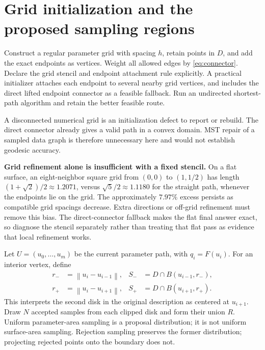 \documentclass[11pt,letterpaper]{article}
\newcommand{\norm}[1]{\left\lVert#1\right\rVert}
\begin{document}
\clearpage
\section{Grid initialization and the proposed sampling regions}
Construct a regular parameter grid with spacing $h$, retain points in $D$, and add the exact endpoints as vertices. Weight all allowed edges by \eqref{eq:connector}. Declare the grid stencil and endpoint attachment rule explicitly. A practical initializer attaches each endpoint to several nearby grid vertices, and includes the direct lifted endpoint connector as a feasible fallback. Run an undirected shortest-path algorithm and retain the better feasible route.

A disconnected numerical grid is an initialization defect to report or rebuild. The direct connector already gives a valid path in a convex domain. MST repair of a sampled data graph is therefore unnecessary here and would not establish geodesic accuracy.

\textbf{Grid refinement alone is insufficient with a fixed stencil.} On a flat surface, an eight-neighbor square grid from $(0,0)$ to $(1,1/2)$ has length $(1+\sqrt{2})/2\approx1.2071$, versus $\sqrt{5}/2\approx1.1180$ for the straight path, whenever the endpoints lie on the grid. The approximately $7.97\%$ excess persists as compatible grid spacings decrease. Extra directions or off-grid refinement must remove this bias. The direct-connector fallback makes the flat final answer exact, so diagnose the stencil separately rather than treating that flat pass as evidence that local refinement works.

Let $U=(u_0,\ldots,u_m)$ be the current parameter path, with $q_i=F(u_i)$. For an interior vertex, define
\begin{align}
 r_-&=\norm{u_i-u_{i-1}},& S_-&=D\cap B(u_{i-1},r_-),\\
 r_+&=\norm{u_i-u_{i+1}},& S_+&=D\cap B(u_{i+1},r_+).
\end{align}
This interprets the second disk in the original description as centered at $u_{i+1}$. Draw $N$ accepted samples from each clipped disk and form their union $R$. Uniform parameter-area sampling is a proposal distribution; it is not uniform surface-area sampling. Rejection sampling preserves the former distribution; projecting rejected points onto the boundary does not.
\end{document}
